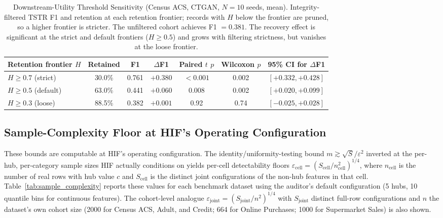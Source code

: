\begin{table}[htbp]
\centering
\caption{Downstream-Utility Threshold Sensitivity (Census ACS, CTGAN, $N=10$ seeds, mean). Integrity-filtered TSTR F1 and retention at each retention frontier; records with $H$ below the frontier are pruned, so a higher frontier is stricter. The unfiltered cohort achieves F1 $= 0.381$. The recovery effect is significant at the strict and default frontiers ($H \ge 0.5$) and grows with filtering strictness, but vanishes at the loose frontier.}
\label{tab:threshold_utility}
\footnotesize
\setlength{\tabcolsep}{3pt}
\begin{tabular}{@{}lcccccc@{}}
\toprule
Retention frontier $H$ & Retained & F1 & $\Delta$F1 & Paired $t$ $p$ & Wilcoxon $p$ & 95\% CI for $\Delta$F1 \\
\midrule
$H \geq 0.7$ (strict) & 30.0\% & 0.761 & $+0.380$ & $<0.001$ & 0.002 & $[+0.332, +0.428]$ \\
$H \geq 0.5$ (default) & 63.0\% & 0.441 & $+0.060$ & 0.008 & 0.002 & $[+0.020, +0.099]$ \\
$H \geq 0.3$ (loose) & 88.5\% & 0.382 & $+0.001$ & 0.92 & 0.74 & $[-0.025, +0.028]$ \\
\bottomrule
\end{tabular}
\end{table}

\subsection{Sample-Complexity Floor at HIF's Operating Configuration}\label{app:sample_complexity}

These bounds are computable at HIF's operating configuration. The identity/uniformity-testing bound $m \gtrsim \sqrt{S}/\varepsilon^2$ \cite{paninski2008,valiant2014instance} inverted at the per-hub, per-category sample sizes HIF actually conditions on yields per-cell detectability floors $\varepsilon_{\text{cell}} = (S_{\text{cell}} / n_{\text{cell}}^2)^{1/4}$, where $n_{\text{cell}}$ is the number of real rows with hub value $c$ and $S_{\text{cell}}$ is the distinct joint configurations of the non-hub features in that cell. Table~\ref{tab:sample_complexity} reports these values for each benchmark dataset using the auditor's default configuration (5 hubs, 10 quantile bins for continuous features). The cohort-level analogue $\varepsilon_{\text{joint}} = (S_{\text{joint}} / n^2)^{1/4}$ with $S_{\text{joint}}$ distinct full-row configurations and $n$ the dataset's own cohort size (2000 for Census ACS, Adult, and Credit; 664 for Online Purchases; 1000 for Supermarket Sales) is also shown.


